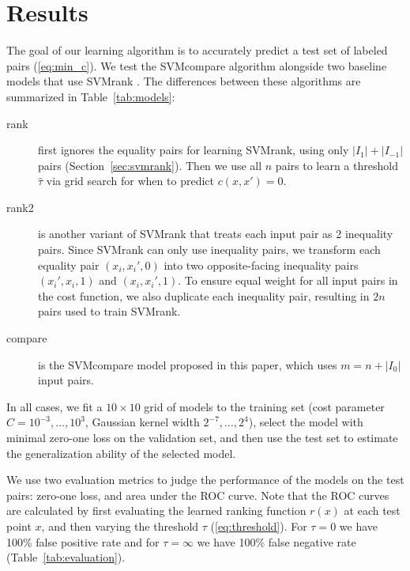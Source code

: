 \documentclass{article}
\begin{document}
\section{Results}
\label{sec:results}

The goal of our learning algorithm is to accurately predict a test set
of labeled pairs (\ref{eq:min_c}). 
We test the SVMcompare algorithm alongside two baseline models that
use SVMrank \citep{ranksvm}. The differences between these algorithms
are summarized in Table~\ref{tab:models}:

\begin{description}
\item[rank] first ignores the equality pairs for learning SVMrank,
  using only $|I_1|+|I_{-1}|$ pairs (Section~\ref{sec:svmrank}). Then
  we use all $n$ pairs to learn a threshold $\hat \tau$ via grid
  search for when to predict $c(x,x')=0$.
\item[rank2] is another variant of SVMrank that treats each input pair
  as 2 inequality pairs. Since SVMrank can only use inequality pairs,
  we transform each equality pair $(x_i,x_i',0)$ into two
  opposite-facing inequality pairs $(x_i',x_i,1)$ and
  $(x_i,x_i',1)$. To ensure equal weight for all input pairs in the
  cost function, we also duplicate each inequality pair, resulting in
  $2n$ pairs used to train SVMrank.
\item[compare] is the SVMcompare model proposed in this paper, which
  uses $m=n+|I_0|$ input pairs.
\end{description}

In all cases, we fit a $10\times 10$ grid of models to the training
set (cost parameter $C=10^{-3},\dots,10^3$, Gaussian kernel width
$2^{-7},\dots,2^4$), select the model with minimal zero-one loss on
the validation set, and then use the test set to estimate the
generalization ability of the selected model.

We use two evaluation metrics to judge the performance of the models
on the test pairs: zero-one loss, and area under the ROC curve. Note
that the ROC curves are calculated by first evaluating the learned
ranking function $r(x)$ at each test point $x$, and then varying the
threshold $\tau$ (\ref{eq:threshold}). For $\tau=0$ we have 100\%
false positive rate and for $\tau=\infty$ we have 100\% false negative
rate (Table~\ref{tab:evaluation}).
\end{document}
